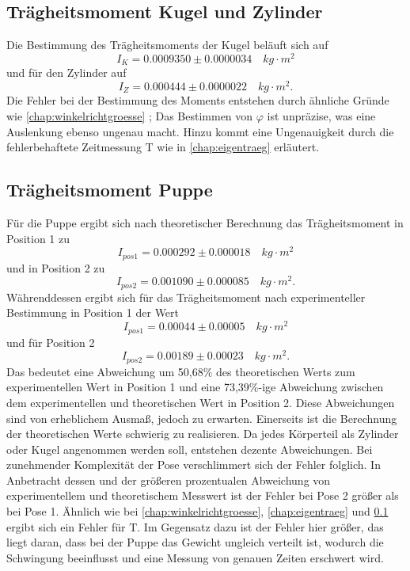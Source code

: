 \subsection{Trägheitsmoment Kugel und Zylinder}
\label{chap:kuzi}
Die Bestimmung des Trägheitsmoments der Kugel beläuft sich auf
\begin{equation*}
    I_K = 0.0009350 \pm 0.0000034 \quad kg \cdot m^2
\end{equation*}
und für den Zylinder auf
\begin{equation*}
    I_Z = 0.000444 \pm 0.0000022 \quad kg \cdot m^2.
\end{equation*}
Die Fehler bei der Bestimmung des Moments entstehen durch ähnliche Gründe
wie \ref{chap:winkelrichtgroesse} ; Das Bestimmen von $\varphi$ ist unpräzise,
was eine Auslenkung ebenso ungenau macht. Hinzu kommt eine Ungenauigkeit 
durch die fehlerbehaftete Zeitmessung T wie in \ref{chap:eigentraeg} erläutert.

\subsection{Trägheitsmoment Puppe}
Für die Puppe ergibt sich nach theoretischer Berechnung das Trägheitsmoment
in Position 1 zu 
\begin{equation*}
    I_{pos1}= 0.000292 \pm 0.000018 \quad kg \cdot m^2
\end{equation*}
und in Position 2 zu 
\begin{equation*}
    I_{pos2}= 0.001090 \pm 0.000085 \quad kg \cdot m^2.
\end{equation*}
Währenddessen ergibt sich für das Trägheitsmoment nach experimenteller
Bestimmung in Position 1 der Wert
\begin{equation*}
    I_{pos1}= 0.00044 \pm 0.00005 \quad kg \cdot m^2
\end{equation*}
und für Position 2
\begin{equation*}
    I_{pos2}= 0.00189 \pm 0.00023 \quad kg \cdot m^2.
\end{equation*}
Das bedeutet eine Abweichung um 50,68\% des theoretischen Werts zum
experimentellen Wert in Position 1 und eine 73,39\%-ige Abweichung zwischen
dem experimentellen und theoretischen Wert in Position 2. Diese Abweichungen
sind von erheblichem Ausmaß, jedoch zu erwarten. Einerseits ist die Berechnung 
der theoretischen Werte schwierig zu realisieren. Da jedes Körperteil als 
Zylinder oder Kugel angenommen werden soll, entstehen dezente Abweichungen.
Bei zunehmender Komplexität der Pose verschlimmert sich der Fehler folglich.
In Anbetracht dessen und der größeren prozentualen Abweichung von experimentellem 
und theoretischem Messwert ist der Fehler bei Pose 2 größer als bei Pose 1.
Ähnlich wie bei \ref{chap:winkelrichtgroesse}, \ref{chap:eigentraeg} und 
\ref{chap:kuzi} ergibt sich ein Fehler für T. Im Gegensatz dazu ist der Fehler
hier größer, das liegt daran, dass bei der Puppe das Gewicht ungleich verteilt
ist, wodurch die Schwingung beeinflusst und eine Messung von genauen Zeiten
erschwert wird.